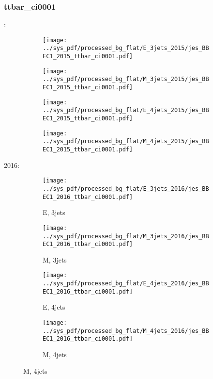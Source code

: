 \documentclass{beamer}
\begin{document}
\begin{frame}
\frametitle{ttbar_ci0001}
\fontsize{5}{1}:
\begin{figure}
\centering
\begin{subfigure}[b]{0.24\textwidth}
\texttt{[image: ../sys\_pdf/processed\_bg\_flat/E\_3jets\_2015/jes\_BBEC1\_2015\_ttbar\_ci0001.pdf]}
\end{subfigure}
\begin{subfigure}[b]{0.24\textwidth}
\texttt{[image: ../sys\_pdf/processed\_bg\_flat/M\_3jets\_2015/jes\_BBEC1\_2015\_ttbar\_ci0001.pdf]}
\end{subfigure}
\begin{subfigure}[b]{0.24\textwidth}
\texttt{[image: ../sys\_pdf/processed\_bg\_flat/E\_4jets\_2015/jes\_BBEC1\_2015\_ttbar\_ci0001.pdf]}
\end{subfigure}
\begin{subfigure}[b]{0.24\textwidth}
\texttt{[image: ../sys\_pdf/processed\_bg\_flat/M\_4jets\_2015/jes\_BBEC1\_2015\_ttbar\_ci0001.pdf]}
\end{subfigure}
\end{figure}
2016:
\begin{figure}
\centering
\begin{subfigure}[b]{0.24\textwidth}
\texttt{[image: ../sys\_pdf/processed\_bg\_flat/E\_3jets\_2016/jes\_BBEC1\_2016\_ttbar\_ci0001.pdf]}
\captionsetup{font=tiny}
\caption{E, 3jets}
\end{subfigure}
\begin{subfigure}[b]{0.24\textwidth}
\texttt{[image: ../sys\_pdf/processed\_bg\_flat/M\_3jets\_2016/jes\_BBEC1\_2016\_ttbar\_ci0001.pdf]}
\captionsetup{font=tiny}
\caption{M, 3jets}
\end{subfigure}
\begin{subfigure}[b]{0.24\textwidth}
\texttt{[image: ../sys\_pdf/processed\_bg\_flat/E\_4jets\_2016/jes\_BBEC1\_2016\_ttbar\_ci0001.pdf]}
\captionsetup{font=tiny}
\caption{E, 4jets}
\end{subfigure}
\begin{subfigure}[b]{0.24\textwidth}
\texttt{[image: ../sys\_pdf/processed\_bg\_flat/M\_4jets\_2016/jes\_BBEC1\_2016\_ttbar\_ci0001.pdf]}
\captionsetup{font=tiny}
\caption{M, 4jets}
\end{subfigure}
\end{figure}
\end{frame}
\end{document}
